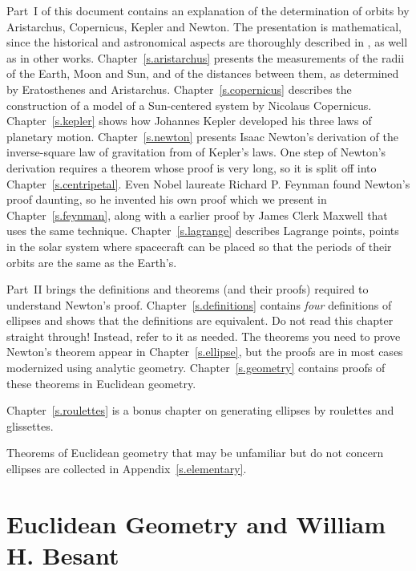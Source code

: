 Part~I of this document contains an explanation of the determination of orbits by Aristarchus, Copernicus, Kepler and Newton. The presentation is mathematical, since the historical and astronomical aspects are thoroughly described in \cite{hahn-cic}, as well as in other works. Chapter~\ref{s.aristarchus} presents the measurements of the radii of the Earth, Moon and Sun, and of the distances between them, as determined by Eratosthenes and Aristarchus. Chapter~\ref{s.copernicus} describes the construction of a model of a Sun-centered system by Nicolaus Copernicus. Chapter~\ref{s.kepler} shows how Johannes Kepler developed his three laws of planetary motion. Chapter~\ref{s.newton} presents Isaac Newton's derivation of the inverse-square law of gravitation from of Kepler's laws. One step of Newton's derivation requires a theorem whose proof is very long, so it is split off into Chapter~\ref{s.centripetal}. Even Nobel laureate Richard P. Feynman found Newton's proof daunting, so he invented his own proof which we present in Chapter~\ref{s.feynman}, along with a earlier proof by James Clerk Maxwell that uses the same technique. Chapter~\ref{s.lagrange} describes Lagrange points, points in the solar system where spacecraft can be placed so that the periods of their orbits are the same as the Earth's.

Part~II brings the definitions and theorems (and their proofs) required to understand Newton's proof. Chapter~\ref{s.definitions} contains \emph{four} definitions of ellipses and shows that the definitions are equivalent. Do not read this chapter straight through! Instead, refer to it as needed. The theorems you need to prove Newton's theorem appear in Chapter~\ref{s.ellipse}, but the proofs are in most cases modernized using analytic geometry.  Chapter~\ref{s.geometry} contains proofs of these theorems in Euclidean geometry.

Chapter~\ref{s.roulettes} is a bonus chapter on generating ellipses by roulettes and glissettes.

Theorems of Euclidean geometry that may be unfamiliar but do not concern ellipses are collected in Appendix~\ref{s.elementary}. 

\section*{Euclidean Geometry and William H. Besant}

